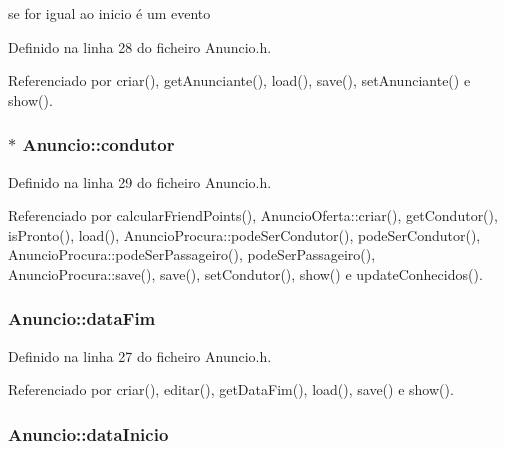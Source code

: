 se for igual ao inicio é um evento 



Definido na linha 28 do ficheiro Anuncio.\+h.



Referenciado por criar(), get\+Anunciante(), load(), save(), set\+Anunciante() e show().

\hypertarget{class_anuncio_a8771818ef0855c6b70e2aca6c89e3177}{
\subsubsection[{condutor}]{$\ast$ Anuncio\+::condutor\hspace{0.3cm}{\ttfamily [protected]}}}\label{class_anuncio_a8771818ef0855c6b70e2aca6c89e3177}


Definido na linha 29 do ficheiro Anuncio.\+h.



Referenciado por calcular\+Friend\+Points(), Anuncio\+Oferta\+::criar(), get\+Condutor(), is\+Pronto(), load(), Anuncio\+Procura\+::pode\+Ser\+Condutor(), pode\+Ser\+Condutor(), Anuncio\+Procura\+::pode\+Ser\+Passageiro(), pode\+Ser\+Passageiro(), Anuncio\+Procura\+::save(), save(), set\+Condutor(), show() e update\+Conhecidos().

\hypertarget{class_anuncio_ac3b9182cc541cb68215f8aa09fb0e11a}{
\subsubsection[{data\+Fim}]{ Anuncio\+::data\+Fim\hspace{0.3cm}{\ttfamily [protected]}}}\label{class_anuncio_ac3b9182cc541cb68215f8aa09fb0e11a}


Definido na linha 27 do ficheiro Anuncio.\+h.



Referenciado por criar(), editar(), get\+Data\+Fim(), load(), save() e show().

\hypertarget{class_anuncio_abeb7d8c5fe5e7d127005044981a3cd3d}{
\subsubsection[{data\+Inicio}]{ Anuncio\+::data\+Inicio\hspace{0.3cm}{\ttfamily [protected]}}}\label{class_anuncio_abeb7d8c5fe5e7d127005044981a3cd3d}


